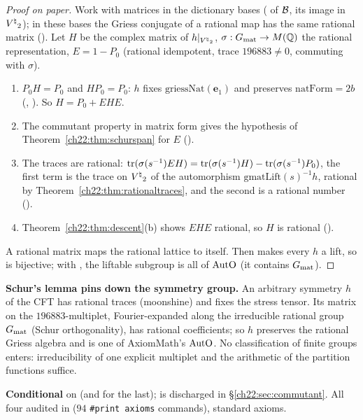 \begin{proof}[Proof on paper]
Work with matrices in the dictionary bases ( of $\mathcal{B}$,  its image in ${V^{\natural}}_2$);
in these bases the Griess conjugate of a rational map has the same rational matrix ().  Let $H$
be the complex matrix of $h|_{{V^{\natural}}_2}$, $\sigma:G_{\mathrm{mat}}\to M({\mathbb{Q}})$ the rational representation, $E=1-P_0$ (rational
idempotent, trace $196883\ne0$, commuting with $\sigma$).
\begin{enumerate}[label=(\arabic*)]
\item $P_0H=P_0$ and $HP_0=P_0$: $h$ fixes $\mathrm{griessNat}(\mathbf{e}_1)$ and preserves $\mathrm{natForm}=2b$
  (, ).  So $H=P_0+EHE$.
\item The commutant property in matrix form gives the hypothesis of Theorem~\ref{ch22:thm:schurspan} for $E$
  ().
\item The traces are rational: $\operatorname{tr}(\sigma(s^{-1})EH)=\operatorname{tr}(\sigma(s^{-1})H)-\operatorname{tr}(\sigma(s^{-1})P_0)$, the first term is the trace
  on ${V^{\natural}}_2$ of the automorphism $\mathrm{gmatLift}(s)^{-1}h$, rational by Theorem~\ref{ch22:thm:rationaltraces}, and the
  second is a rational number ().
\item Theorem~\ref{ch22:thm:descent}(b) shows $EHE$ rational, so $H$ is rational ().
\end{enumerate}
A rational matrix maps the rational lattice to itself.  Then  makes every $h$ a lift, so
 is bijective; with , the liftable subgroup is all of $\mathrm{AutO}$ (it contains
$G_{\mathrm{mat}}$).
\end{proof}
\begin{physics}
\textbf{Schur's lemma pins down the symmetry group.}  An arbitrary symmetry $h$ of the CFT has rational traces (moonshine)
and fixes the stress tensor.  Its matrix on the $196883$-multiplet, Fourier-expanded along the irreducible rational group
$G_{\mathrm{mat}}$ (Schur orthogonality), has rational coefficients; so $h$ preserves the rational Griess algebra and is
one of AxiomMath's $\mathrm{AutO}$.  No classification of finite groups enters: irreducibility of one explicit multiplet and
the arithmetic of the partition functions suffice.
\end{physics}
\begin{status}\textbf{Conditional} on  (and  for the last);  is discharged in
\S\ref{ch22:sec:commutant}.  All four audited in  ($94$
\texttt{\#print axioms} commands), standard axioms.\end{status}

